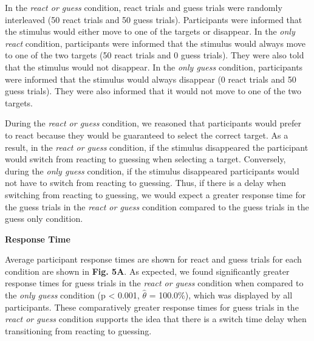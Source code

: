 \documentclass[12pt]{article}
\newcommand\boldblue[1]{\textcolor{mydarkblue}{\textbf{#1}}}
\begin{document}
\noindent In the \emph{react or guess} condition, react trials and guess trials were randomly interleaved (50 react trials and 50 guess trials). Participants were informed that the stimulus would either move to one of the targets or disappear. In the \emph{only react} condition, participants were informed that the stimulus would always move to one of the two targets (50 react trials and 0 guess trials). They were also told that the stimulus would not disappear. In the \emph{only guess} condition, participants were informed that the stimulus would always disappear (0 react trials and 50 guess trials). They were also informed that it would not move to one of the two targets.

During the \emph{react or guess} condition, we reasoned that participants would prefer to react because they would be guaranteed to select the correct target. As a result, in the \emph{react or guess} condition, if the stimulus disappeared the participant would switch from reacting to guessing when selecting a target. Conversely, during the \emph{only guess} condition, if the stimulus disappeared participants would not have to switch from reacting to guessing. Thus, if there is a delay when switching from reacting to guessing, we would expect a greater response time for the guess trials in the \emph{react or guess} condition compared to the guess trials in the guess only condition.

\noindent \boldblue{Response Time} 

\noindent Average participant response times are shown for react and guess trials for each condition are shown in \boldblue{Fig. 5A}. As expected, we found significantly greater response times for guess trials in the \emph{react or guess} condition when compared to the \emph{only guess} condition (p < 0.001, $\hat{\theta}$ = 100.0\%), which was displayed by all participants. These comparatively greater response times for guess trials in the \emph{react or guess} condition supports the idea that there is a switch time delay when transitioning from reacting to guessing.
\end{document}
